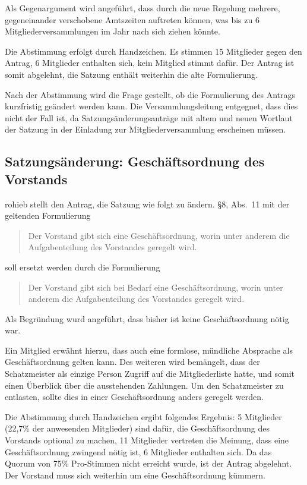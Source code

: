 \documentclass[a4paper,12pt]{scrartcl}
\begin{document}
Als Gegenargument wird angeführt, dass durch die neue Regelung mehrere,
gegeneinander verschobene Amtszeiten auftreten können, was bis zu 6
Mitgliederversammlungen im Jahr nach sich ziehen könnte.

Die Abstimmung erfolgt durch Handzeichen. Es stimmen 15 Mitglieder gegen den
Antrag, 6 Mitglieder enthalten sich, kein Mitglied stimmt dafür. Der Antrag ist
somit abgelehnt, die Satzung enthält weiterhin die alte Formulierung.

Nach der Abstimmung wird die Frage gestellt, ob die Formulierung des Antrags
kurzfristig geändert werden kann. Die Versammlungsleitung entgegnet, dass dies
nicht der Fall ist, da Satzungsänderungsanträge mit altem und neuen Wortlaut der
Satzung in der Einladung zur Mitgliederversammlung erscheinen müssen.

\subsection{Satzungsänderung: Geschäftsordnung des Vorstands}
rohieb stellt den Antrag, die Satzung wie folgt zu ändern. §8, Abs.~11 mit der
geltenden Formulierung
\begin{quote}
  Der Vorstand gibt sich eine Geschäftsordnung, worin unter anderem die
  Aufgabenteilung des Vorstandes geregelt wird.
\end{quote}
soll ersetzt werden durch die Formulierung
\begin{quote}
  Der Vorstand gibt sich bei Bedarf eine Geschäftsordnung, worin unter anderem
  die Aufgabenteilung des Vorstandes geregelt wird.
\end{quote}

Als Begründung wurd angeführt, dass bisher ist keine Geschäftsordnung nötig war.

Ein Mitglied erwähnt hierzu, dass auch eine formlose, mündliche Absprache als
Geschäftsordnung gelten kann. Des weiteren wird bemängelt, dass der
Schatzmeister als einzige Person Zugriff auf die Mitgliederliste hatte, und
somit einen Überblick über die ausstehenden Zahlungen. Um den Schatzmeister zu
entlasten, sollte dies in einer Geschäftsordnung anders geregelt werden.

Die Abstimmung durch Handzeichen ergibt folgendes Ergebnis: 5 Mitglieder
(22{,}7\% der anwesenden Mitglieder) sind dafür, die Geschäftsordnung des
Vorstands optional zu machen, 11 Mitglieder vertreten die Meinung, dass eine
Geschäftsordnung zwingend nötig ist, 6 Mitglieder enthalten sich. Da das Quorum
von 75\% Pro-Stimmen nicht erreicht wurde, ist der Antrag abgelehnt. Der
Vorstand muss sich weiterhin um eine Geschäftsordnung kümmern.
\end{document}
